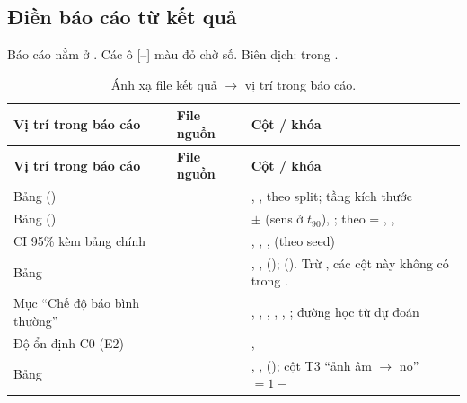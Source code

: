 \subsection{Điền báo cáo từ kết quả}
\label{sec:fill-report}

Báo cáo nằm ở . Các ô \textcolor{badred}{[--]} màu đỏ chờ số. Biên dịch:  trong .

\begin{center}
\small
\begin{longtable}{@{}P{4.2cm}P{4.8cm}P{5.6cm}@{}}
\caption{Ánh xạ file kết quả $\rightarrow$ vị trí trong báo cáo.}\label{tab:fillmap}\\
\toprule
\textbf{Vị trí trong báo cáo} & \textbf{File nguồn} & \textbf{Cột / khóa} \\
\midrule\endfirsthead
\toprule
\textbf{Vị trí trong báo cáo} & \textbf{File nguồn} & \textbf{Cột / khóa} \\
\midrule\endhead
Bảng  () &  & , ,  theo split; tầng kích thước \\
Bảng  () &  &  $\pm$  (sens ở $t_{90}$), ; theo  = , ,  \\
CI 95\% kèm bảng chính &  & , , ,  (theo seed) \\
Bảng  &  & , ,  ();  (). Trừ , các cột này không có trong . \\
Mục ``Chế độ báo bình thường'' &  & , , , , , ; đường học từ dự đoán  \\
Độ ổn định C0 (E2) &  & ,  \\
Bảng  &  & , ,  (); cột T3 ``ảnh âm $\rightarrow$ no'' $= 1 -$  \\

\end{longtable}
\end{center}
